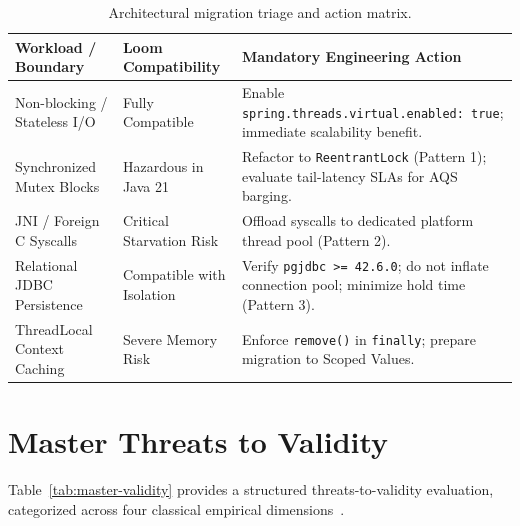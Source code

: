 \begin{table}[htbp]
  \centering
  \caption{Architectural migration triage and action matrix.}
  \label{tab:migration-decision}
  \begin{tabularx}{\textwidth}{@{}>{\raggedright\arraybackslash}p{}>{\raggedright\arraybackslash}p{}>{\raggedright\arraybackslash}X@{}}
    \toprule
    \textbf{Workload / Boundary} & \textbf{Loom Compatibility} & \textbf{Mandatory Engineering Action} \\
    \midrule
    Non-blocking / Stateless I/O & Fully Compatible & Enable \texttt{spring.threads.}\allowbreak \texttt{virtual.enabled: true}; immediate scalability benefit. \\
    \addlinespace
    Synchronized Mutex Blocks & Hazardous in Java 21 & Refactor to \texttt{ReentrantLock} (Pattern 1); evaluate tail-latency SLAs for AQS barging. \\
    \addlinespace
    JNI / Foreign C Syscalls & Critical Starvation Risk & Offload syscalls to dedicated platform thread pool (Pattern 2). \\
    \addlinespace
    Relational JDBC Persistence & Compatible with Isolation & Verify \texttt{pgjdbc >= 42.6.0}; do not inflate connection pool; minimize hold time (Pattern 3). \\
    \addlinespace
    ThreadLocal Context Caching & Severe Memory Risk & Enforce \texttt{remove()} in \texttt{finally}; prepare migration to Scoped Values. \\
    \bottomrule
  \end{tabularx}
\end{table}

\section{Master Threats to Validity}
\label{sec:master-validity}

Table~\ref{tab:master-validity} provides a structured threats-to-validity evaluation, categorized across four classical empirical dimensions~\cite{Wohlin2012}.

